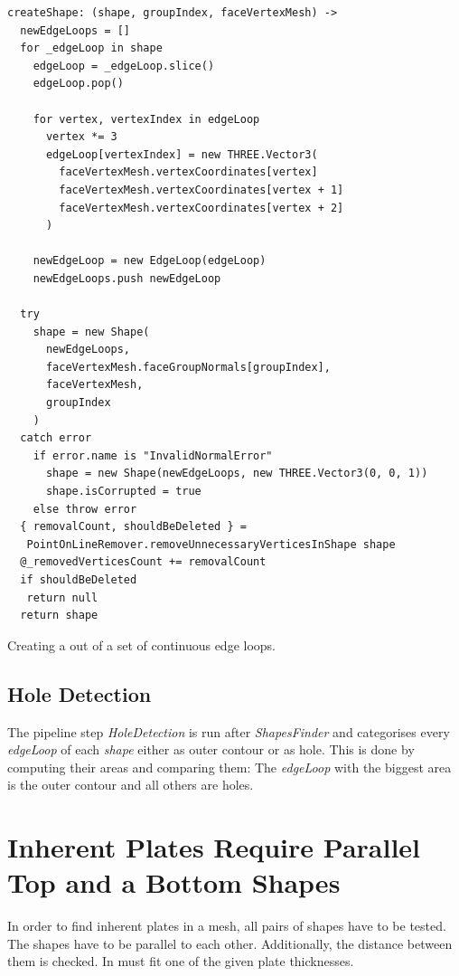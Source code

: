 \documentclass[../ClassicThesis.tex]{subfiles}
\begin{document}
\begin{listing}
\begin{verbatim}
createShape: (shape, groupIndex, faceVertexMesh) ->
  newEdgeLoops = []
  for _edgeLoop in shape
    edgeLoop = _edgeLoop.slice()
    edgeLoop.pop()

    for vertex, vertexIndex in edgeLoop
      vertex *= 3
      edgeLoop[vertexIndex] = new THREE.Vector3(
        faceVertexMesh.vertexCoordinates[vertex]
        faceVertexMesh.vertexCoordinates[vertex + 1]
        faceVertexMesh.vertexCoordinates[vertex + 2]
      )

    newEdgeLoop = new EdgeLoop(edgeLoop)
    newEdgeLoops.push newEdgeLoop

  try
    shape = new Shape(
      newEdgeLoops,
      faceVertexMesh.faceGroupNormals[groupIndex],
      faceVertexMesh,
      groupIndex
    )
  catch error
    if error.name is "InvalidNormalError"
      shape = new Shape(newEdgeLoops, new THREE.Vector3(0, 0, 1))
      shape.isCorrupted = true
    else throw error
  { removalCount, shouldBeDeleted } =
   PointOnLineRemover.removeUnnecessaryVerticesInShape shape
  @_removedVerticesCount += removalCount
  if shouldBeDeleted
   return null
  return shape
\end{verbatim}
\caption{Creating a  out of a set of continuous edge loops.}
\label{lst:createShape}
\end{listing}



\subsection{Hole Detection}\label{sub:holedetection}

The pipeline step \emph{HoleDetection} is run after \emph{ShapesFinder} and categorises every \emph{edgeLoop} of each \emph{shape} either as outer contour or as hole. This is done by computing their areas and comparing them: The \emph{edgeLoop} with the biggest area is the outer contour and all others are holes.



\section{Inherent Plates Require Parallel Top and a Bottom Shapes}\label{sec:inherentplates}

In order to find inherent plates in a mesh, all pairs of shapes have to be tested. The shapes have to be parallel to each other. Additionally, the distance between them is checked. In must fit one of the given plate thicknesses.
\end{document}
